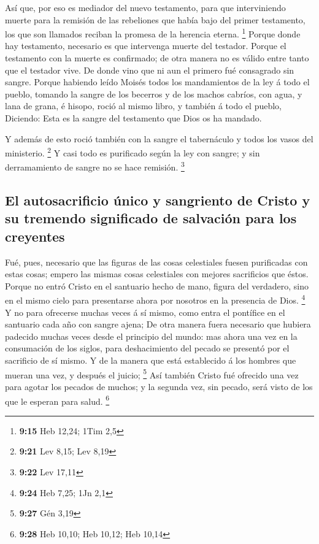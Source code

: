  Así que, por eso es mediador del nuevo testamento, para
que interviniendo muerte para la remisión de las rebeliones que había
bajo del primer testamento, los que son llamados reciban la promesa de
la herencia eterna. \footnote{\textbf{9:15} Heb 12,24; 1Tim 2,5}
 Porque donde hay testamento, necesario es que intervenga
muerte del testador.  Porque el testamento con la muerte es
confirmado; de otra manera no es válido entre tanto que el testador
vive.  De donde vino que ni aun el primero fué consagrado
sin sangre.  Porque habiendo leído Moisés todos los
mandamientos de la ley á todo el pueblo, tomando la sangre de los
becerros y de los machos cabríos, con agua, y lana de grana, é hisopo,
roció al mismo libro, y también á todo el pueblo, 
Diciendo: Esta es la sangre del testamento que Dios os ha mandado.

 Y además de esto roció también con la sangre el
tabernáculo y todos los vasos del ministerio. \footnote{\textbf{9:21}
  Lev 8,15; Lev 8,19}  Y casi todo es purificado según la
ley con sangre; y sin derramamiento de sangre no se hace remisión.
\footnote{\textbf{9:22} Lev 17,11}

\hypertarget{el-autosacrificio-uxfanico-y-sangriento-de-cristo-y-su-tremendo-significado-de-salvaciuxf3n-para-los-creyentes}{%
\subsection{El autosacrificio único y sangriento de Cristo y su tremendo
significado de salvación para los
creyentes}\label{el-autosacrificio-uxfanico-y-sangriento-de-cristo-y-su-tremendo-significado-de-salvaciuxf3n-para-los-creyentes}}

 Fué, pues, necesario que las figuras de las cosas
celestiales fuesen purificadas con estas cosas; empero las mismas cosas
celestiales con mejores sacrificios que éstos.  Porque no
entró Cristo en el santuario hecho de mano, figura del verdadero, sino
en el mismo cielo para presentarse ahora por nosotros en la presencia de
Dios. \footnote{\textbf{9:24} Heb 7,25; 1Jn 2,1}  Y no para
ofrecerse muchas veces á sí mismo, como entra el pontífice en el
santuario cada año con sangre ajena;  De otra manera fuera
necesario que hubiera padecido muchas veces desde el principio del
mundo: mas ahora una vez en la consumación de los siglos, para
deshacimiento del pecado se presentó por el sacrificio de sí mismo.
 Y de la manera que está establecido á los hombres que
mueran una vez, y después el juicio; \footnote{\textbf{9:27} Gén 3,19}
 Así también Cristo fué ofrecido una vez para agotar los
pecados de muchos; y la segunda vez, sin pecado, será visto de los que
le esperan para salud. \footnote{\textbf{9:28} Heb 10,10; Heb 10,12; Heb
  10,14}

